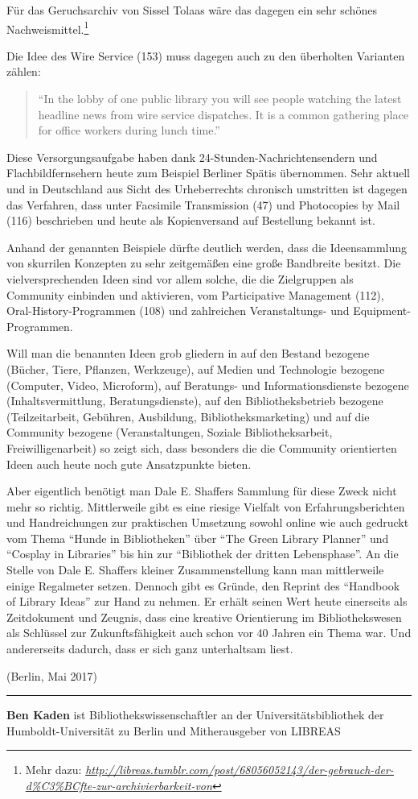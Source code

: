 \documentclass[a4paper,
fontsize=11pt,
oneside,
numbers=noperiodatend,
parskip=half-,
bibliography=totoc,
final
]{scrartcl}
\begin{document}
Für das Geruchsarchiv von Sissel Tolaas wäre das dagegen ein sehr
schönes Nachweismittel.\footnote{Mehr dazu:
  \href{http://libreas.tumblr.com/post/68056052143/der-gebrauch-der-d\%C3\%BCfte-zur-archivierbarkeit-von}{\emph{http://libreas.tumblr.com/post/68056052143/der-gebrauch-der-d\%C3\%BCfte-zur-archivierbarkeit-von}}}

Die Idee des Wire Service (153) muss dagegen auch zu den überholten
Varianten zählen:

\begin{quote}
\enquote{In the lobby of one public library you will see people watching
the latest headline news from wire service dispatches. It is a common
gathering place for office workers during lunch time.}
\end{quote}

Diese Versorgungsaufgabe haben dank 24-Stunden-Nachrichtensendern und
Flachbildfernsehern heute zum Beispiel Berliner Spätis übernommen. Sehr
aktuell und in Deutschland aus Sicht des Urheberrechts chronisch
umstritten ist dagegen das Verfahren, dass unter Facsimile Transmission
(47) und Photocopies by Mail (116) beschrieben und heute als
Kopienversand auf Bestellung bekannt ist.

Anhand der genannten Beispiele dürfte deutlich werden, dass die
Ideensammlung von skurrilen Konzepten zu sehr zeitgemäßen eine große
Bandbreite besitzt. Die vielversprechenden Ideen sind vor allem solche,
die die Zielgruppen als Community einbinden und aktivieren, vom
Participative Management (112), Oral-History-Programmen (108) und
zahlreichen Veranstaltungs- und Equipment-Programmen.

Will man die benannten Ideen grob gliedern in auf den Bestand bezogene
(Bücher, Tiere, Pflanzen, Werkzeuge), auf Medien und Technologie
bezogene (Computer, Video, Microform), auf Beratungs- und
Informationsdienste bezogene (Inhaltsvermittlung, Beratungsdienste), auf
den Bibliotheksbetrieb bezogene (Teilzeitarbeit, Gebühren, Ausbildung,
Bibliotheksmarketing) und auf die Community bezogene (Veranstaltungen,
Soziale Bibliotheksarbeit, Freiwilligenarbeit) so zeigt sich, dass
besonders die die Community orientierten Ideen auch heute noch gute
Ansatzpunkte bieten.

Aber eigentlich benötigt man Dale E. Shaffers Sammlung für diese Zweck
nicht mehr so richtig. Mittlerweile gibt es eine riesige Vielfalt von
Erfahrungsberichten und Handreichungen zur praktischen Umsetzung sowohl
online wie auch gedruckt vom Thema \enquote{Hunde in Bibliotheken} über
\enquote{The Green Library Planner} und \enquote{Cosplay in Libraries}
bis hin zur \enquote{Bibliothek der dritten Lebensphase}. An die Stelle
von Dale E. Shaffers kleiner Zusammenstellung kann man mittlerweile
einige Regalmeter setzen. Dennoch gibt es Gründe, den Reprint des
\enquote{Handbook of Library Ideas} zur Hand zu nehmen. Er erhält seinen
Wert heute einerseits als Zeitdokument und Zeugnis, dass eine kreative
Orientierung im Bibliothekswesen als Schlüssel zur Zukunftsfähigkeit
auch schon vor 40 Jahren ein Thema war. Und andererseits dadurch, dass
er sich ganz unterhaltsam liest.

(Berlin, Mai 2017)

\begin{center}\rule{0.5\linewidth}{\linethickness}\end{center}

\textbf{Ben Kaden} ist Bibliothekswissenschaftler an der
Universitätsbibliothek der Humboldt-Universität zu Berlin und
Mitherausgeber von LIBREAS
\end{document}
